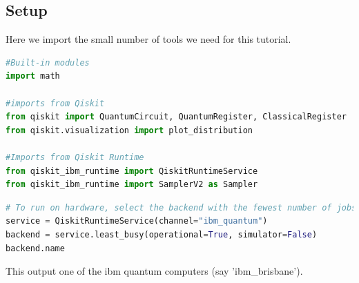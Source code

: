 \documentclass[12pt, oneside]{book}
\theoremstyle{definition}
\theoremstyle{definition}
\theoremstyle{remark}
\begin{document}
\subsection{Setup}
Here we import the small number of tools we need for this tutorial.
\begin{lstlisting}[language=Python]
#Built-in modules
import math

#imports from Qiskit
from qiskit import QuantumCircuit, QuantumRegister, ClassicalRegister
from qiskit.visualization import plot_distribution

#Imports from Qiskit Runtime
from qiskit_ibm_runtime import QiskitRuntimeService
from qiskit_ibm_runtime import SamplerV2 as Sampler
\end{lstlisting}
\begin{lstlisting}[language=Python]
# To run on hardware, select the backend with the fewest number of jobs in the queue
service = QiskitRuntimeService(channel="ibm_quantum")
backend = service.least_busy(operational=True, simulator=False)
backend.name
\end{lstlisting}
This output one of the ibm quantum computers (say 'ibm\_brisbane').
\end{document}
